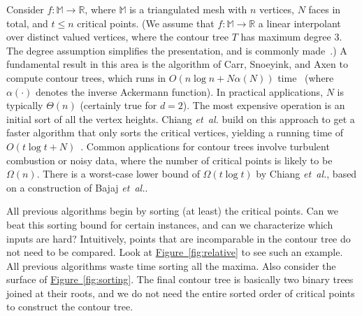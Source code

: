 \documentclass[11pt]{article}
\theoremstyle{definition}
\newcommand{\MM}{\mathbb{M}}
\newcommand{\RR}{\mathbb{R}}
\newcommand{\Fig}[1]{\hyperref[fig:#1]{Figure~\ref*{fig:#1}}} %
\newcommand{\Reminder}[1]{{\color{red}#1}}
\newcommand{\Sesh}[1]{\Reminder{Sesh interjects: #1}}
\newcommand{\etal}{\textit{et~al.}\xspace}
\newcommand{\XSays}[2]{{
      {$\rule[-0.12cm]{0.2in}{0.5cm}$\fbox{\tt
            #1:} }
      \textcolor{red}{#2}
      \marginpar{\textcolor{blue}{#1}}
      {$\rule[0.1cm]{0.3in}{0.1cm}$\fbox{\tt
            end}$\rule[0.1cm]{0.3in}{0.1cm}$}
      }
   }
\renewcommand{\XSays}[2]{}%
\newcommand{\Ben}[1]{{\XSays{Ben}{#1}}}
\begin{document}
Consider $f: \MM \to \RR$, where $\MM$ is a triangulated mesh with $n$ vertices, $N$ faces in total, and $t \leq n$ critical points. 
(We assume that $f:\MM \to \RR$ a linear interpolant over distinct valued vertices, where the contour tree
$T$ has maximum degree $3$. The degree assumption simplifies the presentation, and is commonly made~\cite{kobps-ctsssit-97}.)
A fundamental result in this area is the algorithm of Carr, Snoeyink, and Axen to compute contour trees,
which runs in $O(n\log n + N\alpha(N))$ time~\cite{csa-cctad-03} (where $\alpha(\cdot)$ denotes the inverse
Ackermann function). In practical applications, $N$ is typically $\Theta(n)$
(certainly true for $d=2$). The most expensive operation is an initial sort of all the vertex
heights. Chiang \etal build on this approach to get a faster algorithm that only sorts the critical vertices,
yielding a running time of $O(t\log t + N)$~\cite{cllr-sooscctmp-05}.
Common applications for contour trees involve turbulent combustion or noisy data, where the number of critical points is likely to be $\Omega(n)$.
There is a worst-case
lower bound of $\Omega(t\log t)$ by Chiang \etal \cite{cllr-sooscctmp-05}, based on a construction of Bajaj \etal \cite{BaKr+98}.

All previous algorithms begin by sorting (at least) the critical points. Can we beat this sorting bound for certain instances,
and can we characterize which inputs are hard? Intuitively, points that are incomparable in the contour tree
do not need to be compared. Look at \Fig{relative} to see such an example. All previous algorithms waste time
sorting all the maxima. Also consider the surface of \Fig{sorting}. The final contour tree is basically two binary
trees joined at their roots, and we do not need the entire sorted order of critical points
to construct the contour tree. 

\end{document}

